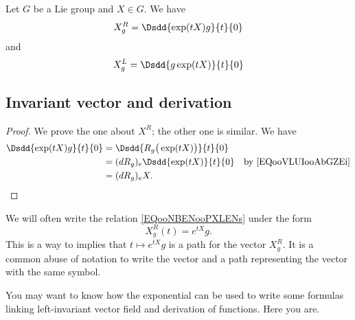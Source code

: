 \begin{lemma}       \label{LEMooLMTZooCvunSl}
	Let \( G\) be a Lie group and \( X\in G\). We have
	\begin{equation}        \label{EQooNBENooPXLENs}
		X^R_g=\Dsdd{  \exp(tX)g }{t}{0}
	\end{equation}
	and
	\begin{equation}
		X^L_g=\Dsdd{  g\exp(tX) }{t}{0}
	\end{equation}
\end{lemma}


\subsection{Invariant vector and derivation}

\begin{proof}
	We prove the one about \( X^R\); the other one is similar. We have
	\begin{subequations}
		\begin{align}
			\Dsdd{ \exp(tX)g }{t}{0} & =\Dsdd{ R_g\big( \exp(tX) \big) }{t}{0}                                      \\
			                         & =(dR_g)_e\Dsdd{ \exp(tX) }{t}{0}        & \text{by \eqref{EQooVLUIooAbGZEi}} \\
			                         & =(dR_g)_eX.
		\end{align}
	\end{subequations}
\end{proof}

\begin{normaltext}      \label{NORMooSATDooIhwXXr}
	We will often write the relation \eqref{EQooNBENooPXLENs} under the form
	\begin{equation}
		X^R_g(t)= e^{tX}g.
	\end{equation}
	This is a way to implies that \( t\mapsto  e^{tX}g\) is a path for the vector \( X^R_g\). It is a common abuse of notation to write the vector and a path representing the vector with the same symbol.
\end{normaltext}


You may want to know how the exponential can be used to write some formulas linking left-invariant vector field and derivation of functions. Here you are.

